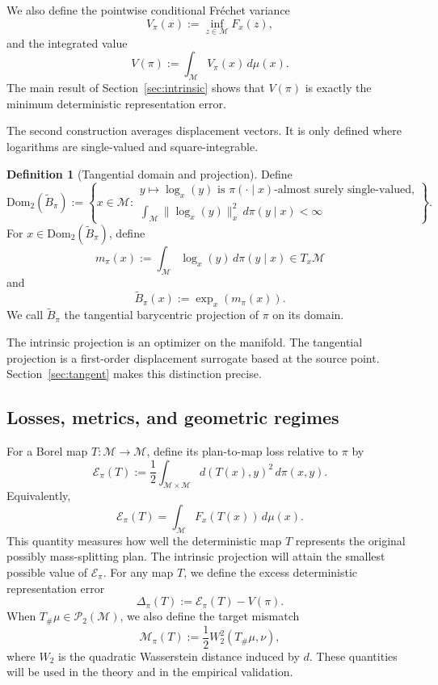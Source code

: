 \documentclass[10pt]{article} %
\theoremstyle{definition}
\newtheorem{definition}[definition]{Definition}
\providecommand{\1}{\mathbf{1}}
\providecommand{\sM}{\mathcal{M}}
\begin{document}
We also define the pointwise conditional Fr\'echet variance
\[
V_\pi(x):=\inf_{z\in\sM}F_x(z),
\]
and the integrated value
\[
V(\pi):=\int_{\sM} V_\pi(x)\,d\mu(x).
\]
The main result of Section~\ref{sec:intrinsic} shows that $V(\pi)$ is exactly the minimum deterministic representation error.

The second construction averages displacement vectors. It is only defined where logarithms are single-valued and square-integrable.

\begin{definition}[Tangential domain and projection]
Define
\[
\mathrm{Dom}_2(\widetilde B_\pi)
:=
\left\{
 x\in\sM:
 \begin{array}{l}
 y\mapsto\log_x(y)\text{ is }\pi(\cdot\mid x)\text{-almost surely single-valued,}\\[0.3em]
 \displaystyle \int_{\sM}\|\log_x(y)\|_x^2\,d\pi(y\mid x)<\infty
 \end{array}
\right\}.
\]
For $x\in\mathrm{Dom}_2(\widetilde B_\pi)$, define
\[
 m_\pi(x):=\int_{\sM}\log_x(y)\,d\pi(y\mid x)\in T_x\sM
\]
and
\[
\widetilde B_\pi(x):=\exp_x(m_\pi(x)).
\]
We call $\widetilde B_\pi$ the {tangential barycentric projection} of $\pi$ on its domain.
\end{definition}

The intrinsic projection is an optimizer on the manifold. The tangential projection is a first-order displacement surrogate based at the source point. Section~\ref{sec:tangent} makes this distinction precise.

\subsection{Losses, metrics, and geometric regimes}

For a Borel map $T:\sM\to\sM$, define its plan-to-map loss relative to $\pi$ by
\[
\mathcal E_\pi(T)
:=
\frac12\int_{\sM\times\sM}d(T(x),y)^2\,d\pi(x,y).
\]
Equivalently,
\[
\mathcal E_\pi(T)=\int_{\sM} F_x(T(x))\,d\mu(x).
\]
This quantity measures how well the deterministic map $T$ represents the original possibly mass-splitting plan. The intrinsic projection will attain the smallest possible value of $\mathcal E_\pi$. For any map $T$, we define the excess deterministic representation error
\[
\Delta_\pi(T):=\mathcal E_\pi(T)-V(\pi).
\]
When $T_\#\mu\in\mathcal P_2(\sM)$, we also define the target mismatch
\[
\mathcal M_\pi(T):=\frac12 W_2^2(T_\#\mu,\nu),
\]
where $W_2$ is the quadratic Wasserstein distance induced by $d$. These quantities will be used in the theory and in the empirical validation.
\end{document}
